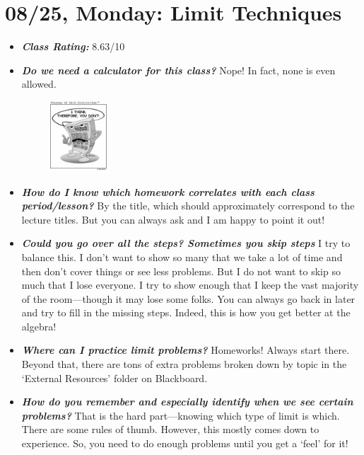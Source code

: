 \documentclass[11pt,letterpaper]{article}
\begin{document}
\newpage
\section*{08/25, Monday: Limit Techniques\label{08-25}}

\begin{itemize}
\item {\bfseries\itshape Class Rating:} 8.63/10
\item {\bfseries\itshape Do we need a calculator for this class?} Nope! In fact, none is even allowed. 
	\begin{figure}[H]
	\centering
	\includegraphics[width=0.2\textwidth]{images/calculator.jpg}
	\end{figure}

\item {\bfseries\itshape How do I know which homework correlates with each class period/lesson?} By the title, which should approximately correspond to the lecture titles. But you can always ask and I am happy to point it out!

\item {\bfseries\itshape Could you go over all the steps? Sometimes you skip steps} I try to balance this. I don't want to show so many that we take a lot of time and then don't cover things or see less problems. But I do not want to skip so much that I lose everyone. I try to show enough that I keep the vast majority of the room---though it may lose some folks. You can always go back in later and try to fill in the missing steps. Indeed, this is how you get better at the algebra!

\item {\bfseries\itshape Where can I practice limit problems?} Homeworks! Always start there. Beyond that, there are tons of extra problems broken down by topic in the `External Resources' folder on Blackboard. 

\item {\bfseries\itshape How do you remember and especially identify when we see certain problems?} That is the hard part---knowing which type of limit is which. There are some rules of thumb. However, this mostly comes down to experience. So, you need to do enough problems until you get a `feel' for it! 


\end{itemize}
\end{document}
